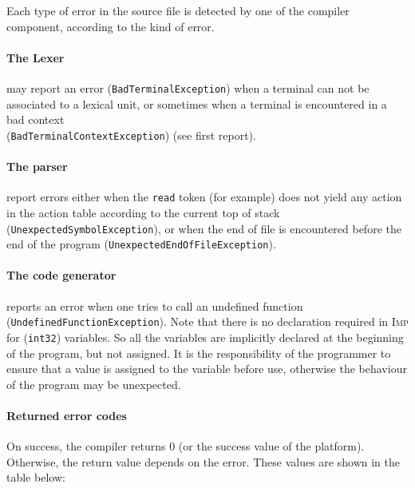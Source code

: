 \documentclass[11pt]{article}
\newcommand\imp{\textsc{Imp}\xspace}
\newcommand\inttt{\texttt{int32}\xspace}
\begin{document}
Each type of error in the source file is detected by one of the compiler component, according to the kind of error.

\paragraph*{The Lexer} may report an error (\texttt{BadTerminalException}) when a terminal can not be associated to a
lexical unit, or sometimes when a terminal is encountered in a bad context \\ (\texttt{BadTerminalContextException}) (see
first report).

\paragraph*{The parser} report errors either when the \texttt{read} token (for example) does not yield any action in the action table
according to the current top of stack (\texttt{UnexpectedSymbolException}),
or when the end of file is encountered before the end of the program (\texttt{UnexpectedEndOfFileException}).

\paragraph*{The code generator} reports an error when one tries to call an undefined function
\\ (\texttt{UndefinedFunctionException}).
Note that there is no declaration required in \imp for (\inttt) variables.
So all the variables are implicitly declared at the beginning of the program, but not assigned.
It is the responsibility of the programmer to ensure that a value is assigned to the variable before use,
otherwise the behaviour of the program may be unexpected.

\paragraph*{Returned error codes}

On success, the compiler returns 0 (or the success value of the platform).
Otherwise, the return value depends on the error.
These values are shown in the table below:
\end{document}

